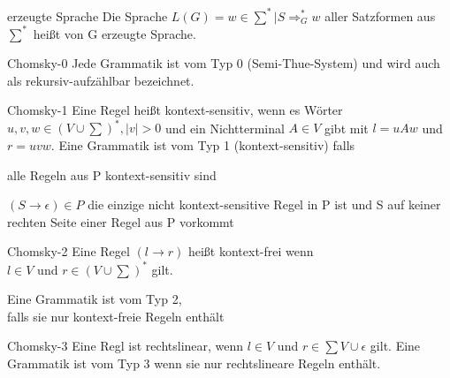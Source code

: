 \documentclass[avery5371, frame]{flashcards}
\begin{document}
\begin{flashcard}[Definition]{erzeugte Sprache}
    Die Sprache $L(G)={w\in \sum^* | S\Rightarrow_G^* w}$ aller Satzformen aus $\sum^*$ heißt von G erzeugte Sprache.
\end{flashcard}

\begin{flashcard}[Definition]{Chomsky-0}
    Jede Grammatik ist vom Typ 0 (Semi-Thue-System) und wird auch als rekursiv-aufzählbar bezeichnet.
\end{flashcard}

\begin{flashcard}[Definition]{Chomsky-1}
    Eine Regel heißt kontext-sensitiv, wenn es Wörter $u,v,w\in(V\cup\sum)^*,|v|>0$ und ein Nichtterminal $A\in V$ gibt mit $l=uAw$ und $r=uvw$.
    Eine Grammatik ist vom Typ 1 (kontext-sensitiv) falls
    \begin{itemize*}
        \item alle Regeln aus P kontext-sensitiv sind
        \item $(S\rightarrow \epsilon)\in P$ die einzige nicht kontext-sensitive Regel in P ist und S auf keiner rechten Seite einer Regel aus P vorkommt
    \end{itemize*}
\end{flashcard}

\begin{flashcard}[Definition]{Chomsky-2}
    Eine Regel $(l\rightarrow r)$ heißt kontext-frei wenn \\
    $l\in V$ und $r\in (V\cup \sum)^*$ gilt.

    Eine Grammatik ist vom Typ 2, \\
    falls sie nur kontext-freie Regeln enthält
\end{flashcard}

\begin{flashcard}[Definition]{Chomsky-3}
    Eine Regl ist rechtslinear, wenn $l\in V$ und $r\in \sum V\cup {\epsilon}$ gilt. Eine Grammatik ist vom Typ 3 wenn sie nur rechtslineare Regeln enthält.
\end{flashcard}
\end{document}
